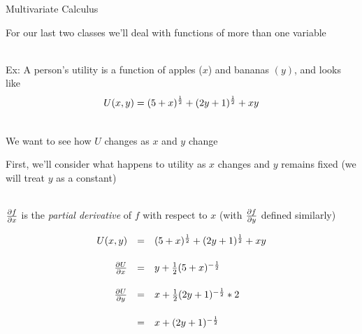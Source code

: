 \documentclass[10pt]{seminar}
\begin{document}
\newtheorem{proposition}{Proposition}

\newtheorem{definition}{Definition}

\newtheorem{corollary}{Corollary}

\newtheorem{theorem}{Theorem}

\newtheorem{lemma}{Lemma}

\def\argmax{\mathop{\rm argmax}\limits}  



\sffamily 


\begin{slide}
\begin{center}

Multivariate Calculus  \end{center}
 
 \newslide
 \small 
 For our last two classes we'll deal with functions of more than one variable
 
\ \\ Ex: A person's utility is a function of apples ($x$) and bananas $(y)$, and looks like $$U(x, y)=(5+x)^{1\over 2}+(2y+1)^{1\over 2}+xy$$

\begin{center}
\end{center}
 
 \ \\We want to see how $U$ changes as $x$ and $y$ change
 
 \newslide
 First, we'll consider what happens to utility as $x$ changes and $y$ remains fixed (we will treat $y$ as a constant)
 
 \ \\${{\partial f}\over {\partial x}}$ is the \textit{partial derivative} of $f$ with respect to $x$ (with ${{\partial f}\over {\partial y}}$ defined similarly)
 
$$\begin{array}{rcl}U(x, y)&=&(5+x)^{1\over 2}+(2y+1)^{1\over 2}+xy \vspace{.2in} \\

 \vspace{.2in}
 
{{\partial U}\over{\partial x}} &=& y+{1\over 2}(5+x)^{-{1\over 2}}\\

  \vspace{.2in}
  
{{\partial U}\over{\partial y}} &=& x+{1\over 2}(2y+1)^{-{1\over 2}}*2\\
&=& x+(2y+1)^{-{1\over 2}}
\end{array}$$


\end{slide}
\end{document}
